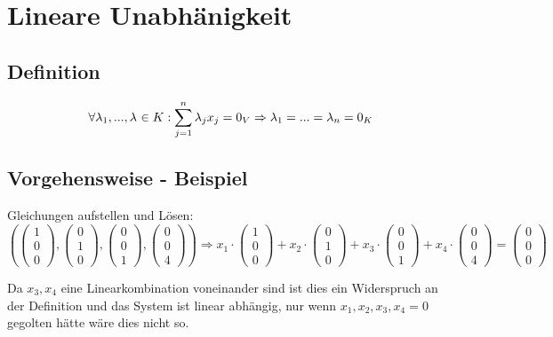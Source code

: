 \section{Lineare Unabhänigkeit}

\subsection{Definition}
\[\forall \lambda _{1},...,\lambda _{} \in K : \sum_{j=1}^{n}\lambda
_{j}x_{j}=0_{V}\Rightarrow \lambda _{1}=...=\lambda _{n}=0_{K}$$\]

\subsection{Vorgehensweise - Beispiel}
Gleichungen aufstellen und Lösen:
\[\left(\begin{pmatrix}1\\0\\0\end{pmatrix},\begin{pmatrix}0\\1\\0\end{pmatrix},\begin{pmatrix}
                                                                                    0\\0\\1\end{pmatrix},\begin{pmatrix}0\\0\\4\end{pmatrix}\right ) \Rightarrow
x_{1}\cdot\begin{pmatrix}1\\0\\0\end{pmatrix}+x_{2}\cdot\begin{pmatrix}0\\1\\0\end{pmatrix}+x_{3}\cdot\begin{pmatrix}0\\0\\1\end{pmatrix}+x_{4}\cdot\begin{pmatrix}0\\0\\4\end
{pmatrix}=\begin{pmatrix}0\\0\\0\end{pmatrix}\]

Da $ x_{3},x_{4}$ eine Linearkombination voneinander sind ist
dies ein Widerspruch an der Definition und das System ist linear abhängig, nur wenn $
x_{1},x_{2}, x_{3}, x_{4} = 0$ gegolten hätte wäre dies nicht so.
